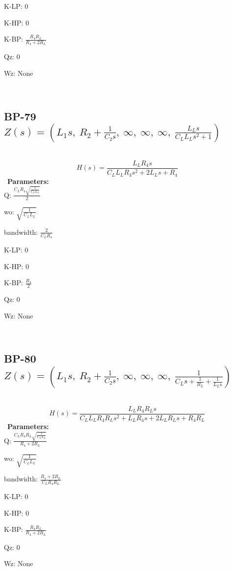 \documentclass{article}
\begin{document}
K-LP: $0$\ 

K-HP: $0$\ 

K-BP: $\frac{R_{4} R_{L}}{R_{4} + 2 R_{L}}$\ 

Qz: $0$\ 

Wz: $\text{None}$\ 

\ 

\subsection{BP-79 $Z(s) = \left( L_{1} s, \  R_{2} + \frac{1}{C_{2} s}, \  \infty, \  \infty, \  \infty, \  \frac{L_{L} s}{C_{L} L_{L} s^{2} + 1}\right)$ } \ 
\textbf{\[H(s) = \frac{L_{L} R_{4} s}{C_{L} L_{L} R_{4} s^{2} + 2 L_{L} s + R_{4}}\] } \ 
\textbf{Parameters:}\\ 

Q: $\frac{C_{L} R_{4} \sqrt{\frac{1}{C_{L} L_{L}}}}{2}$\ 

wo: $\sqrt{\frac{1}{C_{L} L_{L}}}$\ 

bandwidth: $\frac{2}{C_{L} R_{4}}$\ 

K-LP: $0$\ 

K-HP: $0$\ 

K-BP: $\frac{R_{4}}{2}$\ 

Qz: $0$\ 

Wz: $\text{None}$\ 

\ 

\subsection{BP-80 $Z(s) = \left( L_{1} s, \  R_{2} + \frac{1}{C_{2} s}, \  \infty, \  \infty, \  \infty, \  \frac{1}{C_{L} s + \frac{1}{R_{L}} + \frac{1}{L_{L} s}}\right)$ } \ 
\textbf{\[H(s) = \frac{L_{L} R_{4} R_{L} s}{C_{L} L_{L} R_{4} R_{L} s^{2} + L_{L} R_{4} s + 2 L_{L} R_{L} s + R_{4} R_{L}}\] } \ 
\textbf{Parameters:}\\ 

Q: $\frac{C_{L} R_{4} R_{L} \sqrt{\frac{1}{C_{L} L_{L}}}}{R_{4} + 2 R_{L}}$\ 

wo: $\sqrt{\frac{1}{C_{L} L_{L}}}$\ 

bandwidth: $\frac{R_{4} + 2 R_{L}}{C_{L} R_{4} R_{L}}$\ 

K-LP: $0$\ 

K-HP: $0$\ 

K-BP: $\frac{R_{4} R_{L}}{R_{4} + 2 R_{L}}$\ 

Qz: $0$\ 

Wz: $\text{None}$\ 
\end{document}
